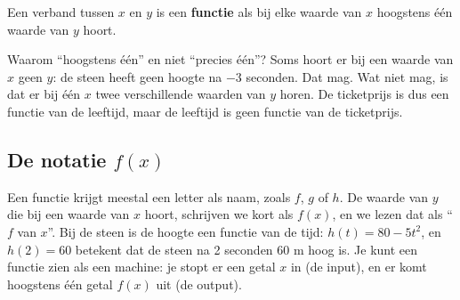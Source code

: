 \begin{theorie}
Een verband tussen $x$ en $y$ is een \textbf{\textcolor{accent}{functie}} als bij elke waarde van $x$ hoogstens één waarde van $y$ hoort.
\end{theorie}

Waarom ``hoogstens één'' en niet ``precies één''? Soms hoort er bij een waarde van $x$ geen $y$: de steen heeft geen hoogte na $-3$ seconden. Dat mag. Wat niet mag, is dat er bij één $x$ twee verschillende waarden van $y$ horen. De ticketprijs is dus een functie van de leeftijd, maar de leeftijd is geen functie van de ticketprijs.



\begin{oefeningen}
\end{oefeningen}

\subsection{De notatie \texorpdfstring{$f(x)$}{f(x)}}

Een functie krijgt meestal een letter als naam, zoals $f$, $g$ of $h$. De waarde van $y$ die bij een waarde van $x$ hoort, schrijven we kort als $f(x)$, en we lezen dat als ``$f$ van $x$''. Bij de steen is de hoogte een functie van de tijd: $h(t) = 80 - 5t^2$, en $h(2) = 60$ betekent dat de steen na 2 seconden 60 m hoog is. Je kunt een functie zien als een machine: je stopt er een getal $x$ in (de input), en er komt hoogstens één getal $f(x)$ uit (de output).

